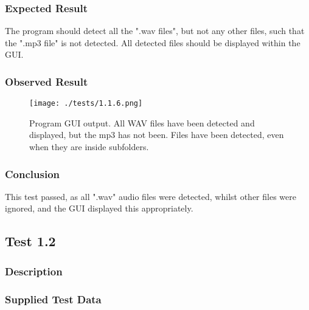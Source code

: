 \subsubsection{Expected Result}
The program should detect all the ".wav files", but not any other files, such that the ".mp3 file" is not detected. All detected files should be displayed within the GUI.

\subsubsection{Observed Result}
\label{sec:evidence1.1}
\begin{figure}[H]
	\texttt{[image: ./tests/1.1.6.png]}
	\caption{Program GUI output. All WAV files have been detected and displayed, but the mp3 has not been. Files have been detected, even when they are inside subfolders.}
\end{figure}

\subsubsection{Conclusion}
This test passed, as all ".wav" audio files were detected, whilst other files were ignored, and the GUI displayed this appropriately.


\pagebreak
\subsection{Test 1.2}
\subsubsection{Description}
\paragraph{}
{
	\centering
}

\subsubsection{Supplied Test Data}
